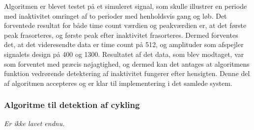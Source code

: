 Algoritmen er blevet testet på et simuleret signal, som skulle illustrer en periode med inaktivitet omringet af to perioder med henholdsvis gang og løb. Det forventede resultat for både time count værdien og peakværdien er, at det første peak frasorteres, og første peak efter inaktivitet frasorteres. Dermed forventes det, at det videresendte data er time count på 512, og amplituder som afspejler signalets design på 400 og 1300. Resultatet af det data, som blev modtaget, var som forventet med præcis nøjagtighed, og dermed kan det antages at algoritmens funktion vedrørende detektering af inaktivitet fungerer efter hensigten. Denne del af algoritmen accepteres og er klar til implementering i det samlede system.

\subsubsection{Algoritme til detektion af cykling}
\textit{Er ikke lavet endnu.}

